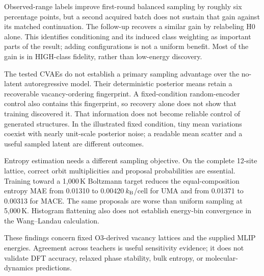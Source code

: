 Observed-range labels improve first-round balanced sampling by roughly six
percentage points, but a second acquired batch does not sustain that gain
against its matched continuation. The follow-up recovers a similar gain by
relabeling H0 alone. This identifies conditioning and its induced class
weighting as important parts of the result; adding configurations is not a
uniform benefit. Most of the gain is in HIGH-class fidelity, rather than
low-energy discovery.

The tested CVAEs do not establish a primary sampling advantage over the
no-latent autoregressive model. Their deterministic posterior means retain
a recoverable vacancy-ordering fingerprint. A fixed-condition random-encoder
control also contains this fingerprint, so recovery alone does not show
that training discovered it. That information does not become reliable
control of generated structures. In the illustrated fixed condition, tiny
mean variations coexist with nearly unit-scale posterior noise; a readable
mean scatter and a useful sampled latent are different outcomes.

Entropy estimation needs a different sampling objective. On the complete
12-site lattice, correct orbit multiplicities and proposal probabilities
are essential. Training toward a 1,000\,K Boltzmann target reduces the
equal-composition entropy MAE from 0.01310 to 0.00420\,$k_{\rm B}$/cell for UMA
and from 0.01371 to 0.00313 for MACE. The same proposals are worse than
uniform sampling at 5,000\,K. Histogram flattening also does not establish
energy-bin convergence in the Wang--Landau calculation.

These findings concern fixed O3-derived vacancy lattices and the supplied
MLIP energies. Agreement across teachers is useful sensitivity evidence;
it does not validate DFT accuracy, relaxed phase stability, bulk entropy,
or molecular-dynamics predictions.
